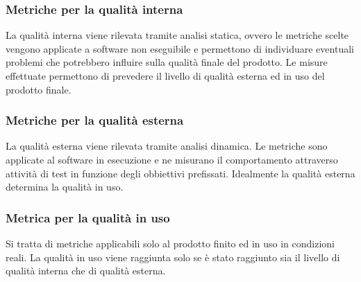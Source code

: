 	\subsubsection{Metriche per la qualità interna}
	La qualità interna viene rilevata tramite analisi statica, ovvero le metriche scelte vengono applicate a software non eseguibile e permettono di individuare eventuali problemi che potrebbero influire sulla qualità finale del prodotto. Le misure effettuate permettono di prevedere il livello di qualità esterna ed in uso del prodotto finale.
	
	\subsubsection{Metriche per la qualità esterna}
	La qualità esterna viene rilevata tramite analisi dinamica. Le metriche sono applicate al software in esecuzione e ne misurano il comportamento attraverso attività di test in funzione degli obbiettivi prefissati.
	Idealmente la qualità esterna determina la qualità in uso.
	
	\subsubsection{Metrica per la qualità in uso}
	Si tratta di metriche applicabili solo al prodotto finito ed in uso in condizioni reali. La qualità in uso viene raggiunta solo se è stato raggiunto sia il livello di qualità interna che di qualità esterna.